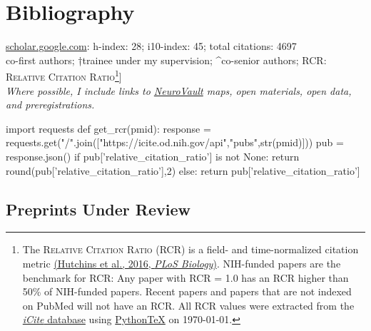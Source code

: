 \documentclass[11pt, letterpaper]{article}
\newcommand{\pytex}{Python\TeX}
\begin{document}
\section*{Bibliography}
\aiGoogleScholar \hspace{.01cm} \href{https://scholar.google.com/citations?user=czV7OcQAAAAJ&hl=en}{scholar.google.com}: h-index: 28; i10-index: 45; total citations: 4697 \\ 
\lbrack*co-first authors; †trainee under my supervision; \^{}co-senior authors; RCR: \textsc{Relative Citation Ratio}\footnote{The \textsc{Relative Citation Ratio} (RCR) is a field- and time-normalized citation metric \href{http://journals.plos.org/plosbiology/article?id=10.1371/journal.pbio.1002541}{(Hutchins et al., 2016, \textit{PLoS Biology})}. NIH-funded papers are the benchmark for RCR: Any paper with RCR = 1.0 has an RCR higher than 50\% of NIH-funded papers. Recent papers and papers that are not indexed on PubMed will not have an RCR. All RCR values were extracted from the \href{https://icite.od.nih.gov/stats}{\textit{iCite} database} using \href{https://github.com/gpoore/pythontex}{\pytex} on \today.}] \\ 

\textit{Where possible, I include links to \href{https://neurovault.org}{NeuroVault} maps, open materials, open data, and preregistrations.}


\begin{pycode}
import requests
def get_rcr(pmid):
  response = requests.get("/".join(["https://icite.od.nih.gov/api","pubs",str(pmid)]))
  pub = response.json()
  if pub['relative_citation_ratio'] is not None:
    return round(pub['relative_citation_ratio'],2)
  else:
    return pub['relative_citation_ratio']
\end{pycode}


\subsection*{Preprints Under Review}
\end{document}
